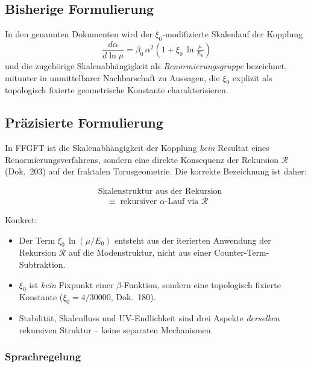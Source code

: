 \subsection*{Bisherige Formulierung}

In den genannten Dokumenten wird der $\xi_0$-modifizierte Skalenlauf
der Kopplung
\begin{equation}
  \frac{d\alpha}{d\ln\mu}
  = \beta_0\,\alpha^2\!\left(1 + \xi_0\,\ln\tfrac{\mu}{E_0}\right)
  \tag{alt -- ungenau}
\end{equation}
und die zugehörige Skalenabhängigkeit als \emph{Renormierungsgruppe}
bezeichnet, mitunter in unmittelbarer Nachbarschaft zu Aussagen, die
$\xi_0$ explizit als topologisch fixierte geometrische Konstante
charakterisieren.

\subsection*{Präzisierte Formulierung}

In FFGFT ist die Skalenabhängigkeit der Kopplung \emph{kein} Resultat
eines Renormierungsverfahrens, sondern eine direkte Konsequenz der
Rekursion $\mathcal{R}$ (Dok.~203) auf der fraktalen Torusgeometrie.
Die korrekte Bezeichnung ist daher:

\begin{equation}
  \boxed{\;
  \begin{aligned}
    &\text{Skalenstruktur aus der Rekursion} \\
    &\quad\equiv\; \text{rekursiver $\alpha$-Lauf via $\mathcal{R}$}
  \end{aligned}
  \;}
  \tag{190.12}
\end{equation}

Konkret:
\begin{itemize}
  \item Der Term $\xi_0\,\ln(\mu/E_0)$ entsteht aus der iterierten
        Anwendung der Rekursion $\mathcal{R}$ auf die Modenstruktur,
        nicht aus einer Counter-Term-Subtraktion.
  \item $\xi_0$ ist \emph{kein} Fixpunkt einer $\beta$-Funktion,
        sondern eine topologisch fixierte Konstante
        ($\xi_0 = 4/30000$, Dok.~180).
  \item Stabilität, Skalenfluss und UV-Endlichkeit sind drei Aspekte
        \emph{derselben} rekursiven Struktur -- keine separaten
        Mechanismen.
\end{itemize}

\subsubsection*{Sprachregelung}

